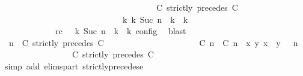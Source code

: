 \begin{isabellebody}
\ \ \ \ \ \ \ \ \ \ \ \ \ \ \ \ \ \ \ \ \ \ \ \ \ \ \ \ \ \ \ \ \ \ {\isasymturnstile}\ {\isasymPsi}\ {\isasymtriangleright}\ {\isacharparenleft}{\isacharparenleft}C\ strictly\ precedes\ C\ {\isacharhash}\ {\isasymPhi}{\isacharparenright}{\isacharparenright}\isanewline
\ \ \ \ \ \ \ \ \ \ \ \ \ \ \ \ \ \ \ \ \ \ \ \ \ \ \ \ \ {\isasymhookrightarrow}\isactrlbsup k\isactrlesup \ {\isacharparenleft}{\isasymGamma}\isactrlsub k{\isacharcomma}\ Suc\ n\ {\isasymturnstile}\ {\isasymPsi}\isactrlsub k\ {\isasymtriangleright}\ {\isasymPhi}\isactrlsub k{\isacharparenright}{\isacartoucheclose}\isanewline
\ \ \ \ \ \ \ \ \ \ \ \ \ rc{\isacharcolon}{\isacartoucheopen}{\isasymrho}\ {\isasymin}\ {\isasymlbrakk}\ {\isasymGamma}\isactrlsub k{\isacharcomma}\ Suc\ n\ {\isasymturnstile}\ {\isasymPsi}\isactrlsub k\ {\isasymtriangleright}\ {\isasymPhi}\isactrlsub k\ {\isasymrbrakk}\isactrlsub c\isactrlsub o\isactrlsub n\isactrlsub f\isactrlsub i\isactrlsub g{\isacartoucheclose}\ \isamarkupfalse%
\ blast\isanewline
\ \ \ \ \ \ \ \ \isamarkupfalse%
\ {\isacartoucheopen}{\isacharparenleft}{\isasymGamma}{\isacharcomma}\ n\ {\isasymturnstile}\ {\isacharparenleft}{\isacharparenleft}C\ strictly\ precedes\ C\ {\isacharhash}\ {\isasymPsi}{\isacharparenright}\ {\isasymtriangleright}\ {\isasymPhi}{\isacharparenright}\isanewline
\ \ \ \ \ \ \ \ \ \ \ \ \ \ \ \ {\isasymhookrightarrow}\ {\isacharparenleft}{\isacharparenleft}{\isacharparenleft}{\isasymlceil}{\isacharhash}\isactrlsup {\isasymle}\ C\ n{\isacharcomma}\ {\isacharhash}\isactrlsup {\isacharless}\ C\ n{\isasymrceil}\ {\isasymin}\ {\isacharparenleft}{\isasymlambda}{\isacharparenleft}x{\isacharcomma}\ y{\isacharparenright}{\isachardot}\ x\ {\isasymle}\ y{\isacharparenright}{\isacharparenright}\ {\isacharhash}\ {\isasymGamma}{\isacharparenright}{\isacharcomma}\ n\isanewline
\ \ \ \ \ \ \ \ \ \ \ \ \ \ {\isasymturnstile}\ {\isasymPsi}\ {\isasymtriangleright}\ {\isacharparenleft}{\isacharparenleft}C\ strictly\ precedes\ C\ {\isacharhash}\ {\isasymPhi}{\isacharparenright}{\isacharparenright}{\isacartoucheclose}\isanewline
\ \ \ \ \ \ \ \ \ \ \isamarkupfalse%
\ {\isacharparenleft}simp\ add{\isacharcolon}\ elims{\isacharunderscore}part\ strictly{\isacharunderscore}precedes{\isacharunderscore}e{\isacharparenright}\isanewline

\end{isabellebody}
